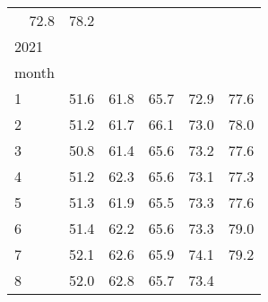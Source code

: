 \begin{tabular}{llllll}
  \multicolumn{1}{r}{72.8} &
  \multicolumn{1}{r}{78.2} \\
\multicolumn{1}{l}{\hspace{1em}2021} &
  \multicolumn{1}{|r}{} &
  \multicolumn{1}{r}{} &
  \multicolumn{1}{r}{} &
  \multicolumn{1}{r}{} &
  \multicolumn{1}{r}{} \\
\multicolumn{1}{l}{\hspace{2em}month} &
  \multicolumn{1}{|r}{} &
  \multicolumn{1}{r}{} &
  \multicolumn{1}{r}{} &
  \multicolumn{1}{r}{} &
  \multicolumn{1}{r}{} \\
\multicolumn{1}{l}{\hspace{3em}1} &
  \multicolumn{1}{|r}{51.6} &
  \multicolumn{1}{r}{61.8} &
  \multicolumn{1}{r}{65.7} &
  \multicolumn{1}{r}{72.9} &
  \multicolumn{1}{r}{77.6} \\
\multicolumn{1}{l}{\hspace{3em}2} &
  \multicolumn{1}{|r}{51.2} &
  \multicolumn{1}{r}{61.7} &
  \multicolumn{1}{r}{66.1} &
  \multicolumn{1}{r}{73.0} &
  \multicolumn{1}{r}{78.0} \\
\multicolumn{1}{l}{\hspace{3em}3} &
  \multicolumn{1}{|r}{50.8} &
  \multicolumn{1}{r}{61.4} &
  \multicolumn{1}{r}{65.6} &
  \multicolumn{1}{r}{73.2} &
  \multicolumn{1}{r}{77.6} \\
\multicolumn{1}{l}{\hspace{3em}4} &
  \multicolumn{1}{|r}{51.2} &
  \multicolumn{1}{r}{62.3} &
  \multicolumn{1}{r}{65.6} &
  \multicolumn{1}{r}{73.1} &
  \multicolumn{1}{r}{77.3} \\
\multicolumn{1}{l}{\hspace{3em}5} &
  \multicolumn{1}{|r}{51.3} &
  \multicolumn{1}{r}{61.9} &
  \multicolumn{1}{r}{65.5} &
  \multicolumn{1}{r}{73.3} &
  \multicolumn{1}{r}{77.6} \\
\multicolumn{1}{l}{\hspace{3em}6} &
  \multicolumn{1}{|r}{51.4} &
  \multicolumn{1}{r}{62.2} &
  \multicolumn{1}{r}{65.6} &
  \multicolumn{1}{r}{73.3} &
  \multicolumn{1}{r}{79.0} \\
\multicolumn{1}{l}{\hspace{3em}7} &
  \multicolumn{1}{|r}{52.1} &
  \multicolumn{1}{r}{62.6} &
  \multicolumn{1}{r}{65.9} &
  \multicolumn{1}{r}{74.1} &
  \multicolumn{1}{r}{79.2} \\
\multicolumn{1}{l}{\hspace{3em}8} &
  \multicolumn{1}{|r}{52.0} &
  \multicolumn{1}{r}{62.8} &
  \multicolumn{1}{r}{65.7} &
  \multicolumn{1}{r}{73.4} &

\end{tabular}
